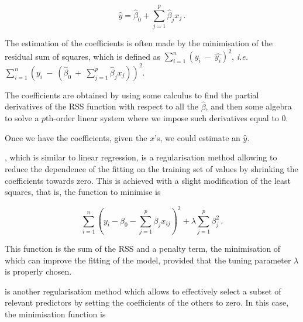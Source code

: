 \documentclass[../main.tex]{subfiles}
\begin{document}
\begin{equation}
	\hat{y} = \hat{\beta}_0 + \sum_{j=1}^{p}\hat{\beta}_j x_j\,.
\end{equation}

The estimation of the coefficients is often made by the minimisation of 
the residual sum of squares, which is defined as 
$\sum_{i=1}^{n}(y_i~-~\hat{y_i})^2$, \textit{i.e.}\ 
$\sum_{i=1}^{n}(y_i~-~(\hat{\beta}_0~+~\sum_{j=1}^{p}\hat{\beta}_jx_j))^2$.

The coefficients are obtained by using some calculus to find the partial 
derivatives of the RSS function with respect to all the $\hat{\beta}$, 
and then some algebra to solve a $p$th-order linear system where we 
impose such derivatives equal to 0.


Once we have the coefficients, given the $x$'s, we could estimate an 
$\hat{y}$.

, which is similar to 
linear regression, is a regularisation method allowing to reduce the 
dependence of the fitting on the training set of values by shrinking the 
coefficients towards zero. This is achieved with a slight modification 
of the least squares, that is, the function to minimise is

\begin{equation}
	\sum_{i=1}^{n}\left(y_i-\beta_0-\sum_{j=1}^{p}\beta_jx_{ij}\right)^2+
		\lambda\sum_{j=1}^{p}\beta_j^2\,.
\end{equation}

This function is the sum of the RSS and a penalty term, the minimisation 
of which can improve the fitting of the model, provided that the tuning 
parameter $\lambda$ is properly chosen.

 is another regularisation 
method which allows to effectively select a subset of relevant 
predictors by setting the coefficients of the others to zero. In this 
case, the minimisation function is
\end{document}
